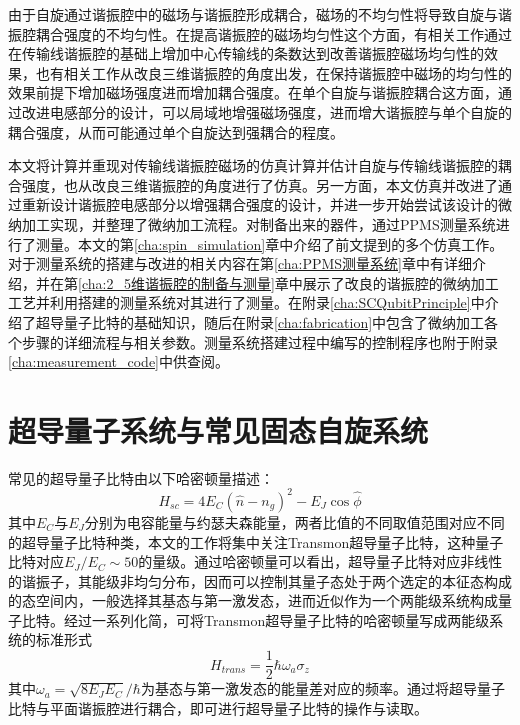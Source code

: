             由于自旋通过谐振腔中的磁场与谐振腔形成耦合，磁场的不均匀性将导致自旋与谐振腔耦合强度的不均匀性。在提高谐振腔的磁场均匀性这个方面，有相关工作通过在传输线谐振腔的基础上增加中心传输线的条数达到改善谐振腔磁场均匀性的效果\cite{Benningshof2013,Mohebbi2014}，也有相关工作从改良三维谐振腔的角度出发，在保持谐振腔中磁场的均匀性的效果前提下增加磁场强度进而增加耦合强度\cite{Angerer2016}。在单个自旋与谐振腔耦合这方面，通过改进电感部分的设计，可以局域地增强磁场强度，进而增大谐振腔与单个自旋的耦合强度\cite{Jenkins2014,Eichler2017}，从而可能通过单个自旋达到强耦合的程度\cite{sarabi2017prospective}。

            本文将计算并重现对传输线谐振腔磁场的仿真计算并估计自旋与传输线谐振腔的耦合强度，也从改良三维谐振腔的角度进行了仿真。另一方面，本文仿真并改进了通过重新设计谐振腔电感部分以增强耦合强度的设计，并进一步开始尝试该设计的微纳加工实现，并整理了微纳加工流程。对制备出来的器件，通过PPMS测量系统进行了测量。本文的第\ref{cha:spin_simulation}章中介绍了前文提到的多个仿真工作。对于测量系统的搭建与改进的相关内容在第\ref{cha:PPMS测量系统}章中有详细介绍，并在第\ref{cha:2_5维谐振腔的制备与测量}章中展示了改良的谐振腔的微纳加工工艺并利用搭建的测量系统对其进行了测量。在附录\ref{cha:SCQubitPrinciple}中介绍了超导量子比特的基础知识，随后在附录\ref{cha:fabrication}中包含了微纳加工各个步骤的详细流程与相关参数。测量系统搭建过程中编写的控制程序也附于附录\ref{cha:measurement_code}中供查阅。




        \section{超导量子系统与常见固态自旋系统} %
        \label{sec:qubit_and_spin}

            常见的超导量子比特由以下哈密顿量描述：
            \begin{equation}
                H_{sc} = 4 E_C (\hat n - n_g)^2 -E_J \cos \hat \phi
            \end{equation}
            其中$ E_C $与$E_J$分别为电容能量与约瑟夫森能量，两者比值的不同取值范围对应不同的超导量子比特种类，本文的工作将集中关注Transmon超导量子比特，这种量子比特对应$E_J/E_C\sim 50$的量级\cite{koch2007charge}。通过哈密顿量可以看出，超导量子比特对应非线性的谐振子，其能级非均匀分布，因而可以控制其量子态处于两个选定的本征态构成的态空间内，一般选择其基态与第一激发态，进而近似作为一个两能级系统构成量子比特。经过一系列化简，可将Transmon超导量子比特的哈密顿量写成两能级系统的标准形式
            \begin{equation}
                H_{trans} = \frac{1}{2}\hbar \omega_a \sigma_z 
            \end{equation}
            其中$ \omega_a = \sqrt{8E_JE_C}/\hbar $为基态与第一激发态的能量差对应的频率。通过将超导量子比特与平面谐振腔进行耦合，即可进行超导量子比特的操作与读取。

